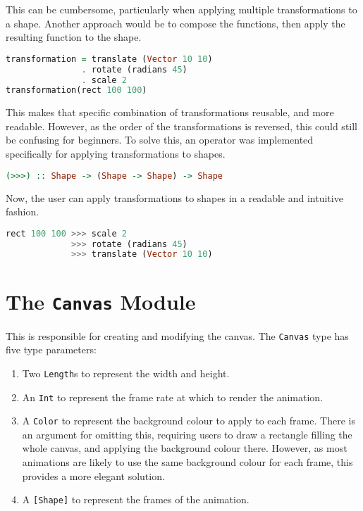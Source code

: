 \documentclass[../main.tex]{subfiles}
\begin{document}
                This can be cumbersome, particularly when applying multiple transformations to
                    a shape.
                Another approach would be to compose the functions, then apply the resulting
                    function to the shape.

                \begin{lstlisting}[language={Haskell}]
transformation = translate (Vector 10 10)
               . rotate (radians 45)
               . scale 2
transformation(rect 100 100)\end{lstlisting}

                This makes that specific combination of transformations reusable, and more
                    readable.
                However, as the order of the transformations is reversed, this could still be
                    confusing for beginners.
                To solve this, an operator was implemented specifically for applying
                    transformations to shapes.

                \begin{lstlisting}[language={Haskell}, label={lst:transform}, caption={The 
                    transformation application (\texttt{>>>}) operator.}]
(>>>) :: Shape -> (Shape -> Shape) -> Shape\end{lstlisting}

                Now, the user can apply transformations to shapes in a readable and intuitive
                    fashion.

                \begin{lstlisting}[language={Haskell}]
rect 100 100 >>> scale 2
             >>> rotate (radians 45)
             >>> translate (Vector 10 10)\end{lstlisting}

    \section{The \texttt{Canvas}
        Module} This is responsible for creating and modifying the canvas.
        The \texttt{Canvas} type has five type parameters:
        \begin{enumerate}
            \item Two \texttt{Length}s to represent the width and height.
            \item An \texttt{Int} to represent the frame rate at which to render the animation.
            \item A \texttt{Color} to represent the background colour to apply to each frame.
                  There is an argument for omitting this, requiring users to draw a rectangle
                      filling the whole canvas, and applying the background colour there.
                  However, as most animations are likely to use the same background colour for
                      each frame, this provides a more elegant solution.
            \item A \texttt{[Shape]} to represent the frames of the animation.
        \end{enumerate}
\end{document}
